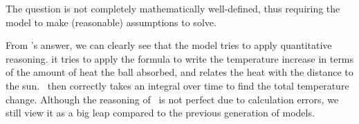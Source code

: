  The question is not completely mathematically well-defined, thus requiring the model to make (reasonable) assumptions to solve.

From \DV's answer, we can clearly see that the model tries to apply quantitative reasoning. it tries to apply the formula to write the temperature increase in terms of the amount of heat the ball absorbed, and relates the heat with the distance to the sun. \DV \ then correctly takes an integral over time to find the total temperature change. 
Although the reasoning of \DV \ is not perfect due to calculation errors, we still view it as a big leap compared to the previous generation of models.  
\begin{comment}
one possible method is to use a simple model of exponential growth and assume that the birth and death rates are constant over time. This is not very realistic, but it might give a rough estimate.
One way to write an exponential growth model is: P(t) = P(0) * e^(rt)
where P(t) is the population at time t, P(0) is the initial population, e is the base of the natural logarithm, and r is the growth rate. We can use the given data to find r by plugging in P(0) = 1000, P(100) = 10000, and t = 100: 10000 = 1000 * e^(r*100).
Solving for r, we get: r = ln(10) / 100
r is approximately 0.0231.
Now, to find the number of people with an age between 40 and 50, we need to estimate the proportion of the population that falls in that age group. One way to do this is to assume that the population has a stable age distribution, meaning that the proportion of people in each age group is constant over time. This is also not very realistic, but it might give a rough estimate.
To find the stable age distribution, we need to know the survival function, which is the probability of surviving from birth to a given age. We can use the exponential growth model to find the survival function by assuming that the death rate is equal to the growth rate. This means that the population is in equilibrium, and that the number of births and deaths are equal. This is also not very realistic, but it might give a rough estimate.
The survival function is:
S(x) = e^(-rx)
where x is the age in years. This means that the probability of surviving from birth to age x is equal to e^(-rx).
To find the proportion of people in the age group 40 to 50, we need to find the probability of surviving from birth to age 40, and subtract the probability of surviving from birth to age 50. This is:
P(40 < x < 50) = S(40) - S(50). P(40 < x < 50) = e^(-r*40) - e^(-r*50)
Plugging in r = 0.0231, we get: P(40 < x < 50) = e^(-0.9239) - e^(-1.1549), P(40 < x < 50) = 0.3967 - 0.3156, P(40 < x < 50) = 0.0811
This means that about 8.11%
N(40 < x < 50) = P(40 < x < 50) * P(100). N(40 < x < 50) = 0.0811 * 10000. N(40 < x < 50) = 811
Therefore, there are about 811 people with an age between 40 and 50 in the town.
\end{comment}




